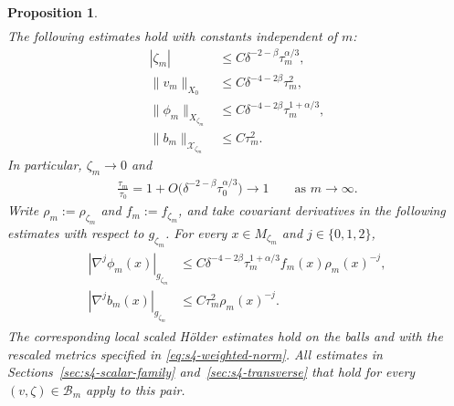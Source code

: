 \documentclass[a4paper,11pt,oneside,reqno]{amsart}
\numberwithin{equation}{section}
\newtheorem{proposition}[theorem]{Proposition}
\theoremstyle{definition}
\begin{document}
\begin{proposition}
\begin{align}
    \end{align}
    The following estimates hold with constants independent of $m$:
    \begin{align}
        |\zeta_m|&\leq C\delta^{-2-\beta}\tau_m^{\alpha/3},
        \label{eq:s4-final-balance}\\
        \|v_m\|_{X_0}&\leq C\delta^{-4-2\beta}\tau_m^2,
        \label{eq:s4-final-v}\\
        \|\phi_m\|_{X_{\zeta_m}}
        &\leq C\delta^{-4-2\beta}\tau_m^{1+\alpha/3},
        \label{eq:s4-final-phi}\\
        \|b_m\|_{\mathcal X_{\zeta_m}}&\leq C\tau_m^2.
        \label{eq:s4-final-b}
    \end{align}
    In particular, $\zeta_m\to0$ and
    \begin{align}
        \label{eq:s4-final-tau-asymptotic}
        \frac{\tau_m}{\tau_0}
        =1+O\bigl(\delta^{-2-\beta}\tau_0^{\alpha/3}\bigr)
        \rightarrow1
        \qquad\mbox{as }m\rightarrow\infty.
    \end{align}
    Write $\rho_m:=\rho_{\zeta_m}$ and $f_m:=f_{\zeta_m}$,
    and take covariant derivatives in the following estimates
    with respect to $g_{\zeta_m}$. For every $x\in M_{\zeta_m}$
    and $j\in\{0,1,2\}$,
    \begin{align}
        \label{eq:s4-final-two-jets}
        \begin{split}
            |\nabla^j\phi_m(x)|_{g_{\zeta_m}}
            &\leq C\delta^{-4-2\beta}\tau_m^{1+\alpha/3}
            f_m(x)\rho_m(x)^{-j},\\
            |\nabla^j b_m(x)|_{g_{\zeta_m}}
            &\leq C\tau_m^2\rho_m(x)^{-j}.
        \end{split}
    \end{align}
    The corresponding local scaled H\"older estimates hold
    on the balls and with the rescaled metrics specified in
    \eqref{eq:s4-weighted-norm}.
    All estimates in Sections~\ref{sec:s4-scalar-family}
    and~\ref{sec:s4-transverse} that hold for every
    $(v,\zeta)\in\mathcal B_m$ apply to this pair.
\end{proposition}
\end{document}
